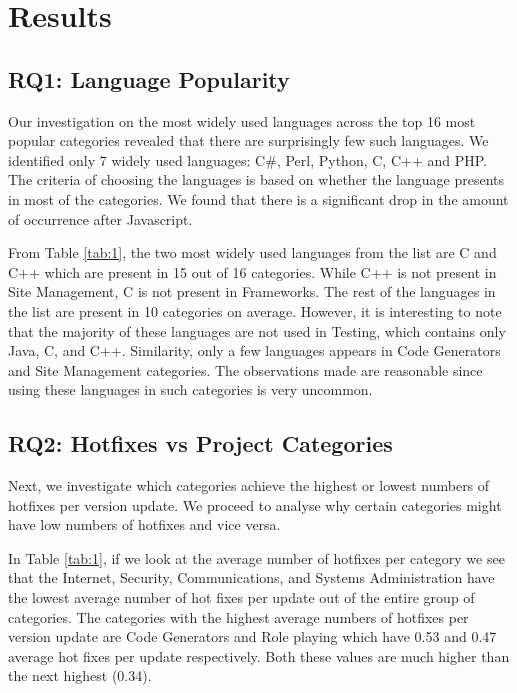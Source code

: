 \documentclass{sig-alternate}
\begin{document}
\section{Results}
\subsection{RQ1: Language Popularity}
Our investigation on the most widely used languages across the top 16 most popular categories revealed that there are surprisingly few such languages. We identified only 7 widely used languages: C\#, Perl, Python, C, C++ and PHP. The criteria of choosing the languages is based on whether the language presents in most of the categories. We found that there is a significant drop in the amount of occurrence after Javascript.  %

From Table \ref{tab:1}, the two most widely used languages from the list are C and C++ which are present in 15 out of 16 categories. While C++ is not present in Site Management, C is not present in Frameworks. The rest of the languages in the list are present in 10 categories on average. However, it is interesting to note that the majority of these languages are not used in Testing, which contains only Java, C, and C++. Similarity, only a few languages appears in Code Generators and Site Management categories. The observations made are reasonable since using these languages in such categories is very uncommon.

\subsection{RQ2: Hotfixes vs Project Categories}
Next, we investigate which categories achieve the highest or lowest numbers of hotfixes per version update. We proceed to analyse why certain categories might have low numbers of hotfixes and vice versa.
    
In Table \ref{tab:1}, if we look at the average number of hotfixes per category we see that the Internet, Security, Communications, and Systems Administration have the lowest average number of hot fixes per update out of the entire group of categories. The categories with the highest average numbers of hotfixes per version update are Code Generators and Role playing which have 0.53 and 0.47 average hot fixes per update respectively. Both these values are much higher than the next highest (0.34).
\end{document}
